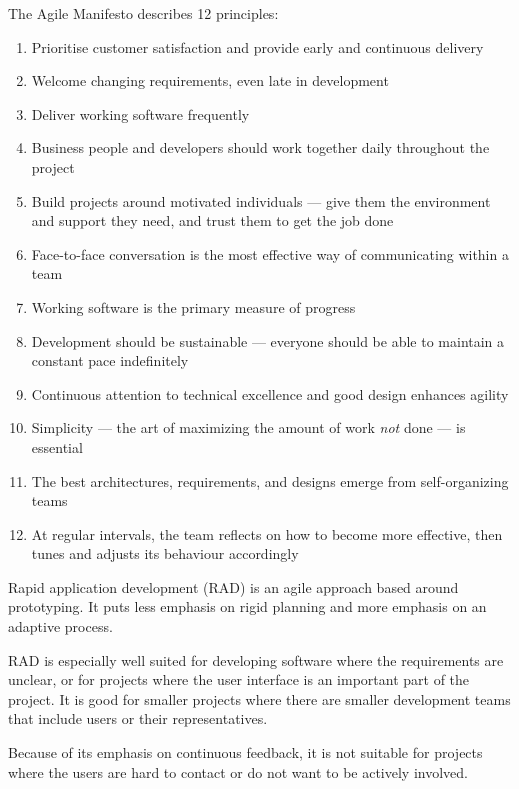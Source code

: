 \documentclass[../main.tex]{subfile}
\begin{document}
The Agile Manifesto describes 12 principles: \vspace{-1ex}\begin{enumerate}
	\item Prioritise customer satisfaction and provide early and continuous delivery
	\item Welcome changing requirements, even late in development
	\item Deliver working software frequently
	\item Business people and developers should work together daily throughout the project
	\item Build projects around motivated individuals --- give them the environment and support they need, and trust them to get the job done
	\item Face-to-face conversation is the most effective way of communicating within a team
	\item Working software is the primary measure of progress
	\item Development should be sustainable ---  everyone should be able to maintain a constant pace indefinitely
	\item Continuous attention to technical excellence and good design enhances agility
	\item Simplicity --- the art of maximizing the amount of work \textit{not} done --- is essential
	\item The best architectures, requirements, and designs emerge from self-organizing teams
	\item At regular intervals, the team reflects on how to become more effective, then tunes and adjusts its behaviour accordingly
\end{enumerate}


Rapid application development (RAD) is an agile approach based around prototyping. It puts less emphasis on rigid planning and more emphasis on an adaptive process.

RAD is especially well suited for developing software where the requirements are unclear, or for projects where the user interface is an important part of the project. It is good for smaller projects where there are smaller development teams that include users or their representatives.

Because of its emphasis on continuous feedback, it is not suitable for projects where the users are hard to contact or do not want to be actively involved.
\end{document}
